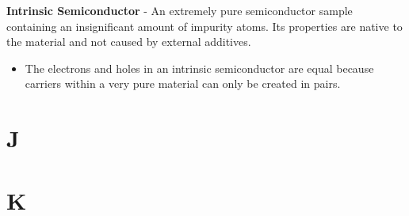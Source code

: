 \vspace{0.5cm}
\noindent
    \textbf{Intrinsic Semiconductor} - An extremely pure semiconductor sample containing an insignificant amount of impurity atoms.  Its properties are native to the material and not caused by external additives.
    \vspace{0.15cm}
    \begin{itemize}
        \setlength\itemsep{0.5em}
        \item{The electrons and holes in an intrinsic semiconductor are equal because carriers within a very pure material can only be created in pairs.}
    \end{itemize}
\section{J}
\section{K}
